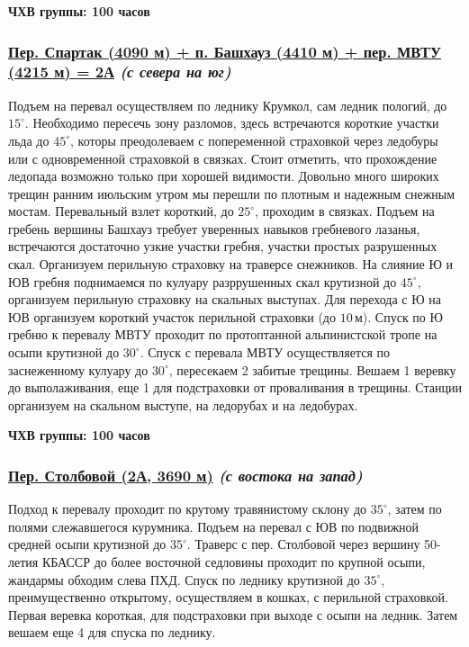 			{\bf ЧХВ группы: 100 часов}

		\subsubsection*{%
			\hyperref[subsec:Day6]{Пер. Спартак (4090 м) + п. Башхауз (4410 м) + пер. МВТУ (4215 м) = 2А}
			{\it (с севера на юг)}%
		}
			Подъем на перевал осуществляем по леднику Крумкол, сам ледник пологий, до $15^\circ$. Необходимо
			пересечь зону разломов, здесь встречаются короткие участки льда до $45^\circ$, которы преодолеваем
			с попеременной страховкой через ледобуры или с одновременной страховкой в связках. Стоит отметить,
			что прохождение ледопада возможно только при хорошей видимости. Довольно много широких трещин ранним
			июльским утром мы перешли по плотным и надежным снежным мостам. Перевальный взлет короткий, до $25^\circ$,
			проходим в связках. Подъем на гребень вершины Башхауз требует уверенных навыков гребневого лазанья,
			встречаются достаточно узкие участки гребня, участки простых разрушенных скал. Организуем перильную
			страховку на траверсе снежников. На слияние Ю и ЮВ гребня поднимаемся по кулуару разррушенных скал
			крутизной до $45^\circ$, организуем перильную страховку на скальных выступах. Для перехода с Ю на ЮВ
			организуем короткий участок перильной страховки (до $10\,\text{м}$). Спуск по Ю гребню к перевалу МВТУ
			проходит по протоптанной альпинистской тропе на осыпи крутизной до $30^\circ$. Спуск с перевала МВТУ
			осуществляется по заснеженному кулуару до $30^\circ$, пересекаем 2 забитые трещины. Вешаем 1 веревку до
			выполаживания, еще 1 для подстраховки от проваливания в трещины. Станции организуем на скальном выступе,
			на ледорубах и на ледобурах.
			
			{\bf ЧХВ группы: 100 часов}

		\subsubsection*{%
			\hyperref[subsec:Day11]{Пер. Столбовой (2А, 3690 м)}
			{\it (с востока на запад)}%
		}
			Подход к перевалу проходит по крутому травянистому склону  до $35^\circ$, затем по полями слежавшегося
			курумника. Подъем на перевал с ЮВ по подвижной средней осыпи крутизной до $35^\circ$. Траверс с
			пер. Столбовой через вершину 50-летия КБАССР до более восточной седловины проходит по крупной осыпи,
			жандармы обходим слева ПХД. Спуск по леднику крутизной до $35^\circ$, преимущественно открытому,
			осуществляем в кошках, с перильной страховкой. Первая веревка короткая, для подстраховки при выходе
			с осыпи на ледник. Затем вешаем еще 4 для спуска по леднику.
			
